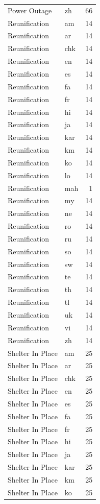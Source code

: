 \begin{longtable}{p{3cm} p{3cm} r}
Power Outage & zh & 66 \\
Reunification & am & 14 \\
Reunification & ar & 14 \\
Reunification & chk & 14 \\
Reunification & en & 14 \\
Reunification & es & 14 \\
Reunification & fa & 14 \\
Reunification & fr & 14 \\
Reunification & hi & 14 \\
Reunification & ja & 14 \\
Reunification & kar & 14 \\
Reunification & km & 14 \\
Reunification & ko & 14 \\
Reunification & lo & 14 \\
Reunification & mah & 1 \\
Reunification & my & 14 \\
Reunification & ne & 14 \\
Reunification & ro & 14 \\
Reunification & ru & 14 \\
Reunification & so & 14 \\
Reunification & sw & 14 \\
Reunification & te & 14 \\
Reunification & th & 14 \\
Reunification & tl & 14 \\
Reunification & uk & 14 \\
Reunification & vi & 14 \\
Reunification & zh & 14 \\
Shelter In Place & am & 25 \\
Shelter In Place & ar & 25 \\
Shelter In Place & chk & 25 \\
Shelter In Place & en & 25 \\
Shelter In Place & es & 25 \\
Shelter In Place & fa & 25 \\
Shelter In Place & fr & 25 \\
Shelter In Place & hi & 25 \\
Shelter In Place & ja & 25 \\
Shelter In Place & kar & 25 \\
Shelter In Place & km & 25 \\
Shelter In Place & ko & 25 \\

\end{longtable}
